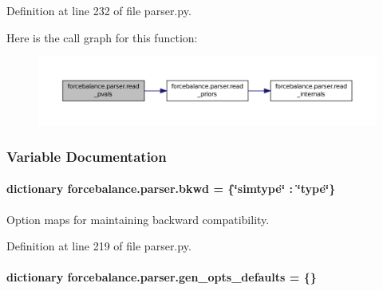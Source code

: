 Definition at line 232 of file parser.\-py.



Here is the call graph for this function\-:\nopagebreak
\begin{figure}[H]
\begin{center}
\leavevmode
\includegraphics[width=350pt]{namespaceforcebalance_1_1parser_a56fb1e139dad24bac29f25a3870765ca_cgraph}
\end{center}
\end{figure}




\subsubsection{Variable Documentation}
\hypertarget{namespaceforcebalance_1_1parser_a121eaaef101563523a8fb20bd5ace409}{
\paragraph[{bkwd}]{\setlength{\rightskip}{0pt plus 5cm}dictionary forcebalance.\-parser.\-bkwd = \{\char`\"{}simtype\char`\"{} \-: \char`\"{}type\char`\"{}\}}}\label{namespaceforcebalance_1_1parser_a121eaaef101563523a8fb20bd5ace409}


Option maps for maintaining backward compatibility. 



Definition at line 219 of file parser.\-py.

\hypertarget{namespaceforcebalance_1_1parser_a980fd024b1f2877247de482247250b9e}{
\paragraph[{gen\-\_\-opts\-\_\-defaults}]{\setlength{\rightskip}{0pt plus 5cm}dictionary forcebalance.\-parser.\-gen\-\_\-opts\-\_\-defaults = \{\}}}\label{namespaceforcebalance_1_1parser_a980fd024b1f2877247de482247250b9e}


